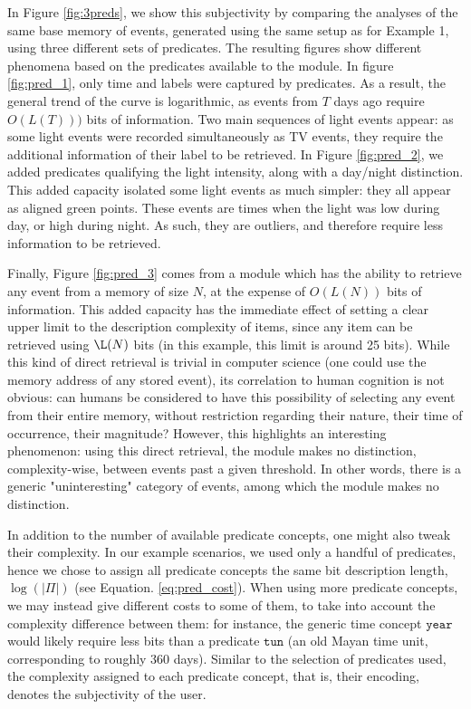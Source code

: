 \documentclass[entropy,article,submit,moreauthors,pdftex]{Definitions/mdpi}
\begin{document}
In Figure \ref{fig:3preds}, we show this subjectivity by comparing the analyses of the same base memory of events, generated using the same setup as for Example 1, using three different sets of predicates. The resulting figures show different phenomena based on the predicates available to the module. In figure \ref{fig:pred_1}, only time and labels were captured by predicates. As a result, the general trend of the curve is logarithmic, as events from $T$ days ago require $O(L(T)))$ bits of information. Two main sequences of light events appear: as some light events were recorded simultaneously as TV events, they require the additional information of their label to be retrieved. In Figure \ref{fig:pred_2}, we added predicates qualifying the light intensity, along with a day/night distinction. This added capacity isolated some light events as much simpler: they all appear as aligned green points. These events are times when the light was low during day, or high during night. As such, they are outliers, and therefore require less information to be retrieved.

Finally, Figure \ref{fig:pred_3} comes from a module which has the ability to retrieve any event from a memory of size $N$, at the expense of $O(L(N))$ bits of information. This added capacity has the immediate effect of setting a clear upper limit to the description complexity of items, since any item can be retrieved using $\L(N)$ bits (in this example, this limit is around 25 bits). While this kind of direct retrieval is trivial in computer science (one could use the memory address of any stored event), its correlation to human cognition is not obvious: can humans be considered to have this possibility of selecting any event from their entire memory, without restriction regarding their nature, their time of occurrence, their magnitude? However, this highlights an interesting phenomenon: using this direct retrieval, the module makes no distinction, complexity-wise, between events past a given threshold. In other words, there is a generic "uninteresting" category of events, among which the module makes no distinction.

In addition to the number of available predicate concepts, one might also tweak their complexity. In our example scenarios, we used only a handful of predicates, hence we chose to assign all predicate concepts the same bit description length, $\log(|\Pi|)$ (see Equation. \ref{eq:pred_cost}). When using more predicate concepts, we may instead give different costs to some of them, to take into account the complexity difference between them: for instance, the generic time concept $\texttt{year}$ would likely require less bits than a predicate $\texttt{tun}$ (an old Mayan time unit, corresponding to roughly 360 days). Similar to the selection of predicates used, the complexity assigned to each predicate concept, that is, their encoding, denotes the subjectivity of the user.
\end{document}
